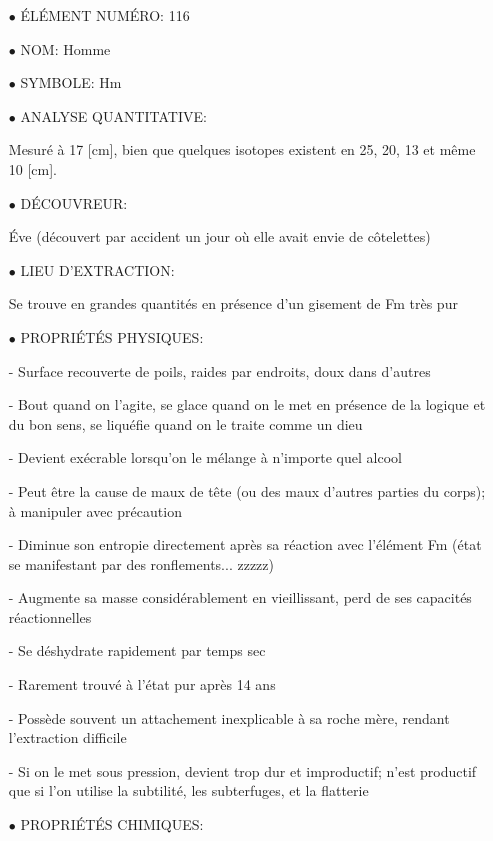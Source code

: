 \begin{itemize}
	\item[$\bullet$] ÉLÉMENT NUMÉRO: 116

	\item[$\bullet$] NOM: Homme

	\item[$\bullet$] SYMBOLE: Hm

	\item[$\bullet$] ANALYSE QUANTITATIVE:	

Mesuré à 17 [cm], bien que quelques isotopes existent en 25, 20, 13 et même 10 [cm].

	\item[$\bullet$] DÉCOUVREUR:

Éve (découvert par accident un jour où elle avait envie de côtelettes)

	\item[$\bullet$] LIEU D'EXTRACTION:	
	
Se trouve en grandes quantités en présence d'un gisement de Fm très pur

	\item[$\bullet$] PROPRIÉTÉS PHYSIQUES:

- Surface recouverte de poils, raides par endroits, doux dans d'autres

- Bout quand on l'agite, se glace quand on le met en présence de la logique et du bon sens, se liquéfie quand on le traite comme un dieu

- Devient exécrable lorsqu'on le mélange à n'importe quel alcool

- Peut être la cause de maux de tête (ou des maux d'autres parties du corps); à manipuler avec précaution

- Diminue son entropie directement après sa réaction avec l'élément Fm (état se manifestant par des ronflements... zzzzz)

- Augmente sa masse considérablement en vieillissant, perd de ses capacités réactionnelles

- Se déshydrate rapidement par temps sec

- Rarement trouvé à l'état pur après 14 ans

- Possède souvent un attachement inexplicable à sa roche mère, rendant l'extraction difficile

- Si on le met sous pression, devient trop dur et improductif; n'est productif que si l'on utilise la subtilité, les subterfuges, et la flatterie

	\item[$\bullet$] PROPRIÉTÉS CHIMIQUES:


\end{itemize}
